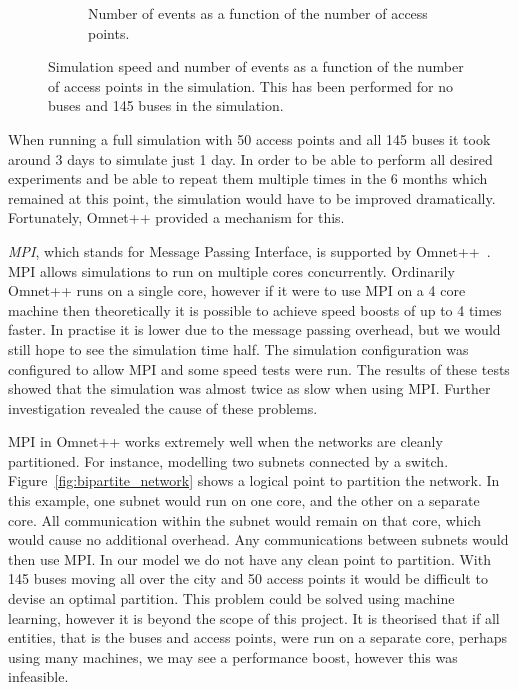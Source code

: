 \begin{figure}
\begin{subfigure}{0.5\textwidth}
                    \caption{Number of events as a function of the number of access points.}
                    \label{fig:access_points_events}
                \end{subfigure}
                \caption{Simulation speed and number of events as a function of the number of access points in the simulation. This has been performed for no buses and 145 buses in the simulation.}
                \label{fig:access_points_vs_time_and_events}
            \end{figure}

            When running a full simulation with 50 access points and all 145 buses it took around 3 days to simulate just 1 day. In order to be able to perform all desired experiments and be able to repeat them multiple times in the 6 months which remained at this point, the simulation would have to be improved dramatically. Fortunately, Omnet++ provided a mechanism for this. 

            \emph{MPI}, which stands for Message Passing Interface, is supported by Omnet++~\cite{omnetmpi}. MPI allows simulations to run on multiple cores concurrently. Ordinarily Omnet++ runs on a single core, however if it were to use MPI on a 4 core machine then theoretically it is possible to achieve speed boosts of up to 4 times faster. In practise it is lower due to the message passing overhead, but we would still hope to see the simulation time half. The simulation configuration was configured to allow MPI and some speed tests were run. The results of these tests showed that the simulation was almost twice as slow when using MPI. Further investigation revealed the cause of these problems. 

            

            MPI in Omnet++ works extremely well when the networks are cleanly partitioned. For instance, modelling two subnets connected by a switch. Figure~\ref{fig:bipartite_network} shows a logical point to partition the network. In this example, one subnet would run on one core, and the other on a separate core. All communication within the subnet would remain on that core, which would cause no additional overhead. Any communications between subnets would then use MPI. In our model we do not have any clean point to partition. With 145 buses moving all over the city and 50 access points it would be difficult to devise an optimal partition. This problem could be solved using machine learning, however it is beyond the scope of this project. It is theorised that if all entities, that is the buses and access points, were run on a separate core, perhaps using many machines, we may see a performance boost, however this was infeasible. 

